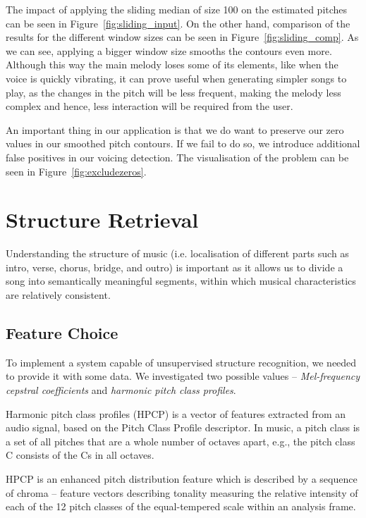 The impact of applying the sliding median of size 100 on the estimated pitches can be seen in Figure~\ref{fig:sliding_input}. On the other hand, comparison of the results for the different window sizes can be seen in Figure~\ref{fig:sliding_comp}. As we can see, applying a bigger window size smooths the contours even more. Although this way the main melody loses some of its elements, like when the voice is quickly vibrating, it can prove useful when generating simpler songs to play, as the changes in the pitch will be less frequent, making the melody less complex and hence, less interaction will be required from the user. 

An important thing in our application is that we do want to preserve our zero values in our smoothed pitch contours. If we fail to do so, we introduce additional false positives in our voicing detection. The visualisation of the problem can be seen in Figure~\ref{fig:excludezeros}.

\vspace{20pt}

\newpage
\section{Structure Retrieval}

Understanding the structure of music (i.e. localisation of different parts such as intro, verse, chorus, bridge, and outro) is important as it allows us to divide a song into semantically meaningful segments, within which musical characteristics are relatively consistent.

\vspace{10pt}

\subsection{Feature Choice}

To implement a system capable of unsupervised structure recognition, we needed to provide it with some data. We investigated two possible values -- \textit{Mel-frequency cepstral coefficients} and \textit{harmonic pitch class profiles}.

Harmonic pitch class profiles (HPCP) is a vector of features extracted from an audio signal, based on the Pitch Class Profile descriptor. In music, a pitch class is a set of all pitches that are a whole number of octaves apart, e.g., the pitch class C consists of the Cs in all octaves. 

HPCP is an enhanced pitch distribution feature which is described by a sequence of chroma -- feature vectors describing tonality measuring the relative intensity of each of the 12 pitch classes of the equal-tempered scale within an analysis frame. 

